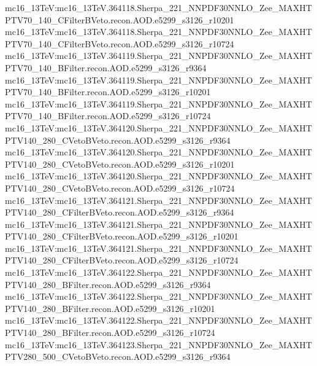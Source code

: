 { mc16\_13TeV:mc16\_13TeV.364118.Sherpa\_221\_NNPDF30NNLO\_Zee\_MAXHTPTV70\_140\_CFilterBVeto.recon.AOD.e5299\_s3126\_r10201  \newline 
 mc16\_13TeV:mc16\_13TeV.364118.Sherpa\_221\_NNPDF30NNLO\_Zee\_MAXHTPTV70\_140\_CFilterBVeto.recon.AOD.e5299\_s3126\_r10724 \newline  
 mc16\_13TeV:mc16\_13TeV.364119.Sherpa\_221\_NNPDF30NNLO\_Zee\_MAXHTPTV70\_140\_BFilter.recon.AOD.e5299\_s3126\_r9364   \newline
 mc16\_13TeV:mc16\_13TeV.364119.Sherpa\_221\_NNPDF30NNLO\_Zee\_MAXHTPTV70\_140\_BFilter.recon.AOD.e5299\_s3126\_r10201 \newline  
 mc16\_13TeV:mc16\_13TeV.364119.Sherpa\_221\_NNPDF30NNLO\_Zee\_MAXHTPTV70\_140\_BFilter.recon.AOD.e5299\_s3126\_r10724   \newline
 mc16\_13TeV:mc16\_13TeV.364120.Sherpa\_221\_NNPDF30NNLO\_Zee\_MAXHTPTV140\_280\_CVetoBVeto.recon.AOD.e5299\_s3126\_r9364  \newline 
 mc16\_13TeV:mc16\_13TeV.364120.Sherpa\_221\_NNPDF30NNLO\_Zee\_MAXHTPTV140\_280\_CVetoBVeto.recon.AOD.e5299\_s3126\_r10201 \newline
 mc16\_13TeV:mc16\_13TeV.364120.Sherpa\_221\_NNPDF30NNLO\_Zee\_MAXHTPTV140\_280\_CVetoBVeto.recon.AOD.e5299\_s3126\_r10724 \newline  
 mc16\_13TeV:mc16\_13TeV.364121.Sherpa\_221\_NNPDF30NNLO\_Zee\_MAXHTPTV140\_280\_CFilterBVeto.recon.AOD.e5299\_s3126\_r9364  \newline  
 mc16\_13TeV:mc16\_13TeV.364121.Sherpa\_221\_NNPDF30NNLO\_Zee\_MAXHTPTV140\_280\_CFilterBVeto.recon.AOD.e5299\_s3126\_r10201 \newline   
 mc16\_13TeV:mc16\_13TeV.364121.Sherpa\_221\_NNPDF30NNLO\_Zee\_MAXHTPTV140\_280\_CFilterBVeto.recon.AOD.e5299\_s3126\_r10724 \newline  
 mc16\_13TeV:mc16\_13TeV.364122.Sherpa\_221\_NNPDF30NNLO\_Zee\_MAXHTPTV140\_280\_BFilter.recon.AOD.e5299\_s3126\_r9364   \newline  
 mc16\_13TeV:mc16\_13TeV.364122.Sherpa\_221\_NNPDF30NNLO\_Zee\_MAXHTPTV140\_280\_BFilter.recon.AOD.e5299\_s3126\_r10201  \newline   
 mc16\_13TeV:mc16\_13TeV.364122.Sherpa\_221\_NNPDF30NNLO\_Zee\_MAXHTPTV140\_280\_BFilter.recon.AOD.e5299\_s3126\_r10724   \newline  
 mc16\_13TeV:mc16\_13TeV.364123.Sherpa\_221\_NNPDF30NNLO\_Zee\_MAXHTPTV280\_500\_CVetoBVeto.recon.AOD.e5299\_s3126\_r9364  \newline   
}
